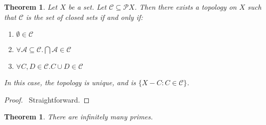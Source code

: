 \documentclass{book}
\newtheorem{thm}[ax]{Theorem}
\theoremstyle{definition}
\begin{document}
\begin{thm}
Let $X$ be a set. Let $\mathcal{C} \subseteq \mathcal{P} X$. Then there exists a topology on $X$ such that $\mathcal{C}$ is the set of closed sets if and only if:
\begin{enumerate}
\item $\emptyset \in \mathcal{C}$
\item $\forall \mathcal{A} \subseteq \mathcal{C}. \bigcap \mathcal{A} \in \mathcal{C}$
\item $\forall C,D \in \mathcal{C}. C \cup D \in \mathcal{C}$
\end{enumerate}
In this case, the topology is unique, and is $\{ X - C : C \in \mathcal{C} \}$.
\end{thm}

\begin{proof}
\pf\ Straightforward.
\end{proof}

\begin{thm}
There are infinitely many primes.
\end{thm}
\end{document}
